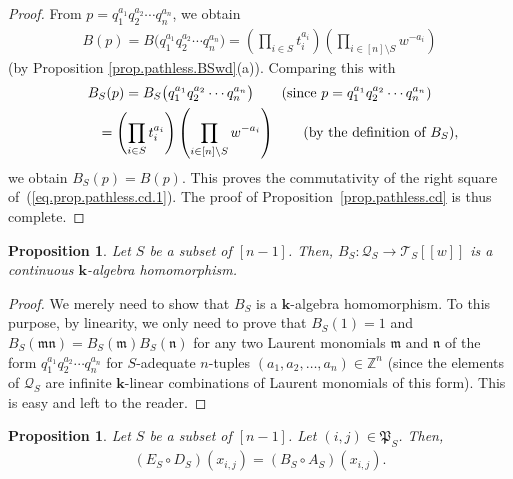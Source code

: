 \documentclass[pdftex]{sigma}
\newtheorem{Proposition}[Theorem]{Proposition}
\numberwithin{equation}{section}
\let\prodnonlimits\prod
\renewcommand{\prod}{\prodnonlimits\limits}
\begin{document}
\begin{proof}
From $p=q_{1}^{a_{1}}q_{2}^{a_{2}}\cdots q_{n}^{a_{n}}$, we obtain
\begin{gather*}
B(p) =B\big( q_{1}^{a_{1}}q_{2}^{a_{2}}\cdots q_{n}^{a_{n}}\big) =\left( \prod_{i\in S}t_{i}^{a_{i}}\right) \left( \prod _{i\in[n] \setminus S}w^{-a_{i}}\right)
\end{gather*}
(by Proposition \ref{prop.pathless.BSwd}(a)). Comparing this with
\begin{gather*}
B_{S}(p)=B_{S}\big( q_{1}^{a_{1}}q_{2}^{a_{2}}\cdots q_{n}^{a_{n}}\big) \qquad ( \text{since }p=q_{1}^{a_{1}}q_{2}^{a_{2}}\cdots q_{n}^{a_{n}}) \\
\hphantom{B_{S}(p)}{} =\left( \prod_{i\in S}t_{i}^{a_{i}}\right) \left( \prod_{i\in [n] \setminus S}w^{-a_{i}}\right) \qquad ( \text{by the definition of }B_{S}) ,
\end{gather*}
we obtain $B_{S}(p) =B(p) $. This proves the commutativity of the right square of~(\ref{eq.prop.pathless.cd.1}). The proof of Proposition~\ref{prop.pathless.cd} is thus complete.
\end{proof}

\begin{Proposition}\label{prop.pathless.BS-alg}Let $S$ be a subset of $[n-1] $. Then, $B_{S}\colon \mathcal{Q}_{S}\rightarrow\mathcal{T}_{S} [ [ w] ] $ is a continuous $\mathbf{k}$-algebra homomorphism.
\end{Proposition}

\begin{proof}We merely need to show that $B_{S}$ is a $\mathbf{k}$-algebra homomorphism. To this purpose, by linearity, we only need to prove that $B_{S}(1) =1$ and $B_{S}( \mathfrak{mn}) =B_{S}( \mathfrak{m}) B_{S}(\mathfrak{n}) $ for any two Laurent monomials $\mathfrak{m}$ and $\mathfrak{n}$ of the form $q_{1}^{a_{1}}q_{2}^{a_{2}}\cdots q_{n}^{a_{n}}$ for $S$-adequate $n$-tuples $( a_{1},a_{2},\ldots,a_{n}) \in\mathbb{Z}^{n}$ (since the elements of $\mathcal{Q}_{S}$ are infinite $\mathbf{k}$-linear combinations of Laurent monomials of this form). This is easy and left to the reader.
\end{proof}

\begin{Proposition}\label{prop.pathless.AB}Let $S$ be a subset of $[n-1] $. Let $(i,j) \in\mathfrak{P}_{S}$. Then,
\begin{gather*}
 ( E_{S}\circ D_{S} ) (x_{i,j}) = ( B_{S}\circ A_{S} ) ( x_{i,j} ) .
\end{gather*}
\end{Proposition}
\end{document}
